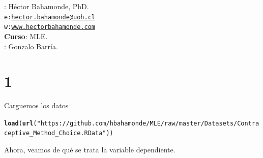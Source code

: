 \documentclass[onesided]{article}\usepackage[]{graphicx}\usepackage[]{color}
\makeatletter
\newcommand{\hlstr}[1]{\textcolor[rgb]{0.192,0.494,0.8}{#1}}%
\newcommand{\hlstd}[1]{\textcolor[rgb]{0.345,0.345,0.345}{#1}}%
\newcommand{\hlkwd}[1]{\textcolor[rgb]{0.737,0.353,0.396}{\textbf{#1}}}%
\newenvironment{kframe}{%
 \def\at@end@of@kframe{}%
 \ifinner\ifhmode%
  \def\at@end@of@kframe{\end{minipage}}%
  \begin{minipage}{\columnwidth}%
 \fi\fi%
 \def\FrameCommand##1{\hskip\@totalleftmargin \hskip-\fboxsep
 \colorbox{shadecolor}{##1}\hskip-\fboxsep
     \hskip-\linewidth \hskip-\@totalleftmargin \hskip\columnwidth}%
 \MakeFramed {\advance\hsize-\width
   \@totalleftmargin\z@ \linewidth\hsize
   \@setminipage}}%
 {\par\unskip\endMakeFramed%
 \at@end@of@kframe}
\newenvironment{knitrout}{}{} %
\makeatother
\begin{document}











\hspace{-5mm}{\bf Profesor}: H\'ector Bahamonde, PhD.\\
\texttt{e:}\href{mailto:hector.bahamonde@uoh.cl}{\texttt{hector.bahamonde@uoh.cl}}\\
\texttt{w:}\href{http://www.hectorbahamonde.com}{\texttt{www.hectorbahamonde.com}}\\
{\bf Curso}: MLE.\\
\hspace{-5mm}{\bf TA}: Gonzalo Barr\'ia.

\section{1}

Carguemos los datos

\begin{knitrout}
\color{fgcolor}\begin{kframe}
\begin{alltt}
\hlkwd{load}\hlstd{(}\hlkwd{url}\hlstd{(}\hlstr{"https://github.com/hbahamonde/MLE/raw/master/Datasets/Contraceptive_Method_Choice.RData"}\hlstd{))}
\end{alltt}
\end{kframe}
\end{knitrout}

Ahora, veamos de qu\'e se trata la variable dependiente.
\end{document}
